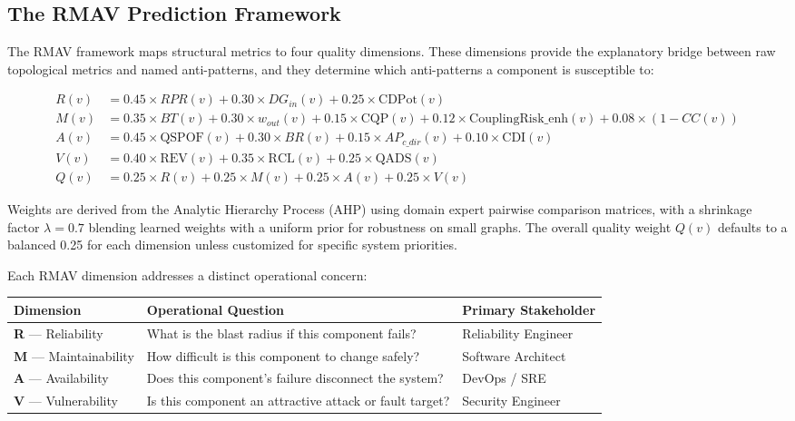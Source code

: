\documentclass[11pt]{article}
\begin{document}
\subsection{The RMAV Prediction Framework}

The RMAV framework maps structural metrics to four quality dimensions. These dimensions provide the explanatory bridge between raw topological metrics and named anti-patterns, and they determine which anti-patterns a component is susceptible to:

\begin{align*}
R(v) &= 0.45 \times RPR(v) + 0.30 \times DG_{in}(v) + 0.25 \times \mathrm{CDPot}(v) \\
M(v) &= 0.35 \times BT(v) + 0.30 \times w_{out}(v) + 0.15 \times \mathrm{CQP}(v) + 0.12 \times \mathrm{CouplingRisk\_enh}(v) + 0.08 \times (1 - CC(v)) \\
A(v) &= 0.45 \times \mathrm{QSPOF}(v) + 0.30 \times BR(v) + 0.15 \times AP_{c\_dir}(v) + 0.10 \times \mathrm{CDI}(v) \\
V(v) &= 0.40 \times \mathrm{REV}(v) + 0.35 \times \mathrm{RCL}(v) + 0.25 \times \mathrm{QADS}(v) \\[4pt]
Q(v) &= 0.25 \times R(v) + 0.25 \times M(v) + 0.25 \times A(v) + 0.25 \times V(v)
\end{align*}

Weights are derived from the Analytic Hierarchy Process (AHP) using domain expert pairwise comparison matrices, with a shrinkage factor $\lambda = 0.7$ blending learned weights with a uniform prior for robustness on small graphs. The overall quality weight $Q(v)$ defaults to a balanced 0.25 for each dimension unless customized for specific system priorities.

Each RMAV dimension addresses a distinct operational concern:

\begin{center}
\begin{tabular}{@{}llp{6cm}@{}}
\toprule
\textbf{Dimension} & \textbf{Operational Question} & \textbf{Primary Stakeholder} \\
\midrule
\textbf{R} --- Reliability & What is the blast radius if this component fails? & Reliability Engineer \\
\textbf{M} --- Maintainability & How difficult is this component to change safely? & Software Architect \\
\textbf{A} --- Availability & Does this component's failure disconnect the system? & DevOps / SRE \\
\textbf{V} --- Vulnerability & Is this component an attractive attack or fault target? & Security Engineer \\
\bottomrule
\end{tabular}
\end{center}
\end{document}
